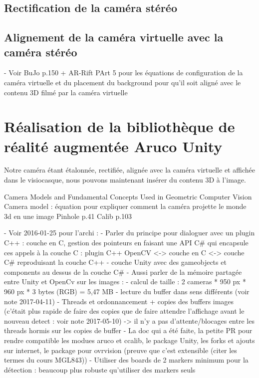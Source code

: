 \subsection{Rectification de la caméra stéréo}

\subsection{Alignement de la caméra virtuelle avec la caméra stéréo}
- Voir BuJo p.150 + AR-Rift PArt 5 pour les équations de configuration de la caméra virtuelle et du placement du background pour qu'il soit aligné avec le contenu 3D filmé par la caméra virtuelle


\section{Réalisation de la bibliothèque de réalité augmentée Aruco Unity}
\label{sec:aruco_unity}

Notre caméra étant étalonnée, rectifiée, alignée avec la caméra virtuelle et affichée dans le visiocasque, nous pouvons maintenant insérer du contenu 3D à l'image.

Camera Models and Fundamental Concepts Used in Geometric Computer Vision
Camera model : équation pour expliquer comment la caméra projette le monde 3d en une image
Pinhole p.41
Calib p.103

- Voir 2016-01-25 pour l'archi :
  - Parler du principe pour dialoguer avec un plugin C++ : couche en C, gestion des pointeurs en faisant une API C\# qui encapsule ces appels à la couche C : plugin C++ OpenCV <-> couche en C <-> couche C\# reproduisant la couche C++ 
  - couche Unity avec des gameobjects et components au dessus de la couche C\#
- Aussi parler de la mémoire partagée entre Unity et OpenCv sur les images :
  - calcul de taille : 2 cameras * 950 px * 960 px * 3 bytes (RGB) = 5,47 MB
  - lecture du buffer dans sens différents (voir note 2017-04-11)
  - Threads et ordonnancement + copies des buffers images (c'était plus rapide de faire des copies que de faire attendre l'affichage avant le nouveau detect : voir note 2017-05-10) -> il n'y a pas d'attente/blocages entre les threads hormis sur les copies de buffer
- La doc qui a été faite, la petite PR pour rendre compatible les modues aruco et ccalib, le package Unity, les forks et ajouts sur internet, le package pour ovrvision (preuve que c'est extensible (citer les termes du cours MGL843))
- Utiliser des boards de 2 markers minimum pour la détection : beaucoup plus robuste qu'utiliser des markers seuls


